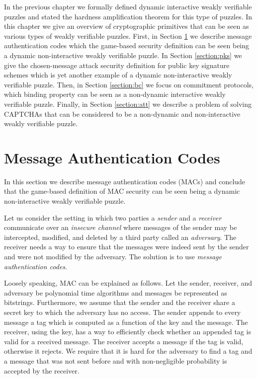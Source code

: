 %
In the previous chapter we formally defined dynamic interactive weakly verifiable puzzles
and stated the hardness amplification theorem for this type of puzzles.
In this chapter we give an overview of cryptographic primitives that can be seen as various types of weakly verifiable puzzles.
First, in Section \ref{section:mac} we describe message authentication codes which the game-based security definition can be seen being a dynamic
non-interactive weakly verifiable puzzle.
In Section \ref{section:pks} we give the chosen-message attack security definition
for public key signature schemes which is yet another example of a dynamic non-interactive weakly verifiable puzzle.
Then, in Section \ref{section:bc} we focus on commitment protocols, which binding property can be seen as a non-dynamic interactive  weakly verifiable puzzle.
Finally, in Section \ref{section:att} we describe a problem of solving CAPTCHAs that can be considered to be a non-dynamic and non-interactive weakly verifiable puzzle.

\section{Message Authentication Codes}
\label{section:mac}
In this section we describe message authentication codes (MACs) and conclude that the game-based definition of MAC
security can be seen being a dynamic non-interactive weakly verifiable puzzle.

Let us consider the setting in which two parties a \textit{sender} and a \textit{receiver} communicate over an \textit{insecure channel} where
messages of the sender may be intercepted, modified, and deleted by a third party called an \textit{adversary}.
The receiver needs a way to ensure that the messages were indeed sent by the sender and were not modified by the adversary.
The solution is to use \textit{message authentication codes}.

Loosely speaking, MAC can be explained as follows.
Let the sender, receiver, and adversary be polynomial time algorithms and messages be represented as bitstrings.
Furthermore, we assume that the sender and the receiver share a secret key to which the adversary has no access.
The sender appends to every message a tag which is computed as a function of the key and the message.
The receiver, using the key, has a way to efficiently check whether an appended tag is valid for a received message.
The receiver accepts a message if the tag is valid, otherwise it rejects.
We require that it is hard for the adversary to find a tag and a message that was not sent before and
with non-negligible probability is accepted by the receiver.

